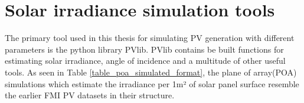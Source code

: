 \chapter{Solar irradiance simulation tools}
The primary tool used in this thesis for simulating PV generation with different parameters is the python library PVlib. PVlib contains be built functions for estimating solar irradiance, angle of incidence and a multitude of other useful tools. As seen in Table \ref{table_poa_simulated_format}, the plane of array(POA) simulations which estimate the irradiance per 1m² of solar panel surface resemble the earlier FMI PV datasets in their structure.









